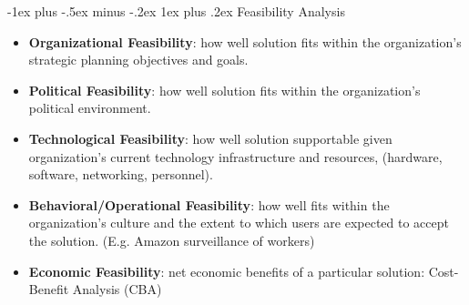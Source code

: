 \documentclass[12pt, landscape]{article}
\makeatletter
\renewcommand{\subsubsection}{\@startsection{subsubsection}{3}{0mm}%
                                {-1ex plus -.5ex minus -.2ex}%
                                {1ex plus .2ex}%
                                {\normalfont\small\bfseries}}
\makeatother
\begin{document}
\begin{multicols*}{3}
\subsubsection{Feasibility Analysis}
\begin{itemize}
    \item \textbf{Organizational Feasibility}: how well solution fits within the organization’s strategic planning objectives and goals.
    \item \textbf{Political Feasibility}: how well solution fits within the organization’s political environment.
    \item \textbf{Technological Feasibility}: how well solution supportable given organization’s current technology infrastructure and resources, (hardware, software, networking, personnel).    
    \item \textbf{Behavioral/Operational Feasibility}: how well fits within the organization’s culture and the extent to which users are expected to accept the solution. (E.g. Amazon surveillance of workers)
    \item \textbf{Economic Feasibility}: net economic benefits of a particular solution: Cost-Benefit Analysis (CBA)
\end{itemize}






\end{multicols*}
\end{document}
